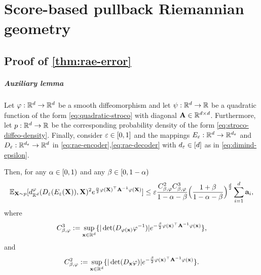 \chapter{Score-based pullback Riemannian geometry}
\section{Proof of \ref{thm:rae-error}}
\label{app:proof-of-rae-error}

\paragraph{Auxiliary lemma}

\begin{lemma}
    \label{lem:rae-bound-phi-metric}
        Let $\varphi:\mathbb{R}^d \to \mathbb{R}^d$ be a smooth diffeomorphism and let $\psi: \mathbb{R}^d \to \mathbb{R}$ be a quadratic function of the form \ref{eq:quadratic-stroco} with diagonal $\mathbf{A} \in \mathbb{R}^{d\times d}$. Furthermore, let $p:\mathbb{R}^d \to\mathbb{R}$ be the corresponding probability density of the form \ref{eq:stroco-diffeo-density}. Finally, consider $\varepsilon\in [0,1]$ and the mappings $E_\varepsilon:\mathbb{R}^d \to \mathbb{R}^{d_\varepsilon}$ and $D_\varepsilon:\mathbb{R}^{d_\varepsilon} \to \mathbb{R}^d$ in \ref{eq:rae-encoder},\ref{eq:rae-decoder} with $d_\varepsilon \in [d]$ as in \ref{eq:dimind-epsilon}.
    
        Then, for any $\alpha \in [0,1)$ and any $\beta\in [0,1- \alpha)$
        \begin{equation}
        \mathbb{E}_{\mathbf{X} \sim p}[d_{\mathbb{R}^{d}}^\varphi (D_\varepsilon(E_\varepsilon(\mathbf{X})), \mathbf{X})^2 e^{\frac{\alpha}{2} \varphi(\mathbf{X})^\top \mathbf{A}^{-1} \varphi(\mathbf{X})}] \leq \varepsilon \frac{C^2_{\beta,\varphi} C^3_{\beta,\varphi}}{1 - \alpha - \beta} \Bigl(\frac{1 + \beta}{1 - \alpha - \beta} \Bigr)^{\frac{d}{2}} \sum_{i=1}^{d} \mathbf{a}_{i},
        \label{eq:lem-rae-bound}
\end{equation}
where
\begin{equation}
    C^3_{\beta,\varphi} := \sup_{\mathbf{x}\in \mathbb{R}^{d}} \{ |\det (D_{\varphi(\mathbf{x})} \varphi^{-1})| e^{-\frac{\beta}{2} \varphi(\mathbf{x})^\top \mathbf{A}^{-1} \varphi(\mathbf{x}) } \},
    \label{eq:RAEinvdiffeoRegConstant}
\end{equation}
and
\begin{equation}
    C^2_{\beta,\varphi} := \sup_{\mathbf{x}\in \mathbb{R}^{d}} \{ |\det (D_{\mathbf{x}} \varphi)| e^{-\frac{\beta}{2} \varphi(\mathbf{x})^\top \mathbf{A}^{-1} \varphi(\mathbf{x}) } \}.
    \label{eq:RAEdiffeoRegConstant}
\end{equation}
\end{lemma}

